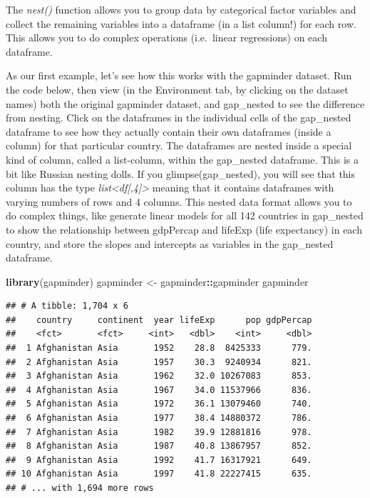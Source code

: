 \documentclass[
]{book}
\newenvironment{Shaded}{\begin{snugshade}}{\end{snugshade}}
\newcommand{\KeywordTok}[1]{\textcolor[rgb]{0.13,0.29,0.53}{\textbf{#1}}}
\newcommand{\NormalTok}[1]{#1}
\newcommand{\OperatorTok}[1]{\textcolor[rgb]{0.81,0.36,0.00}{\textbf{#1}}}
\newcommand{\StringTok}[1]{\textcolor[rgb]{0.31,0.60,0.02}{#1}}
\begin{document}
The \emph{nest()} function allows you to group data by categorical factor variables and collect the remaining variables into a dataframe (in a list column!) for each row. This allows you to do complex operations (i.e.~linear regressions) on each dataframe.

As our first example, let's see how this works with the gapminder dataset.
Run the code below, then view (in the Environment tab, by clicking on the dataset names) both the original gapminder dataset, and gap\_nested to see the difference from nesting.
Click on the dataframes in the individual cells of the gap\_nested dataframe to see how they actually contain their own dataframes (inside a column) for that particular country.
The dataframes are nested inside a special kind of column, called a list-column, within the gap\_nested dataframe.
This is a bit like Russian nesting dolls. If you glimpse(gap\_nested), you will see that this column has the type \emph{list\textless df{[},4{]}\textgreater{}} meaning that it contains dataframes with varying numbers of rows and 4 columns.
This nested data format allows you to do complex things, like generate linear models for all 142 countries in gap\_nested to show the relationship between gdpPercap and lifeExp (life expectancy) in each country, and store the slopes and intercepts as variables in the gap\_nested dataframe.

\begin{Shaded}
\begin{Highlighting}[]
\KeywordTok{library}\NormalTok{(gapminder)}
\NormalTok{gapminder <-}\StringTok{ }\NormalTok{gapminder}\OperatorTok{::}\NormalTok{gapminder}
\NormalTok{gapminder}
\end{Highlighting}
\end{Shaded}

\begin{verbatim}
## # A tibble: 1,704 x 6
##    country     continent  year lifeExp      pop gdpPercap
##    <fct>       <fct>     <int>   <dbl>    <int>     <dbl>
##  1 Afghanistan Asia       1952    28.8  8425333      779.
##  2 Afghanistan Asia       1957    30.3  9240934      821.
##  3 Afghanistan Asia       1962    32.0 10267083      853.
##  4 Afghanistan Asia       1967    34.0 11537966      836.
##  5 Afghanistan Asia       1972    36.1 13079460      740.
##  6 Afghanistan Asia       1977    38.4 14880372      786.
##  7 Afghanistan Asia       1982    39.9 12881816      978.
##  8 Afghanistan Asia       1987    40.8 13867957      852.
##  9 Afghanistan Asia       1992    41.7 16317921      649.
## 10 Afghanistan Asia       1997    41.8 22227415      635.
## # ... with 1,694 more rows
\end{verbatim}
\end{document}
